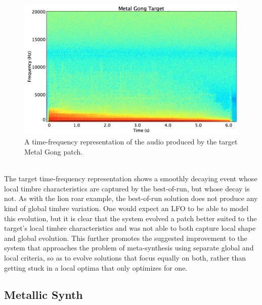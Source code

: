 \documentclass[12pt]{report} 	%
\numberwithin{figure}{chapter}
\numberwithin{table}{chapter}
\numberwithin{equation}{chapter}
\begin{document}
\begin{flushleft}
\begin{figure}[h!]
\begin{center}
\includegraphics[scale=0.35,width=\linewidth]{MetalGongTargetSTFT}
\caption[Target metal gong time-frequency representation]{A time-frequency representation of the audio produced by the target Metal Gong patch.}
\end{center}
\end{figure}
\\
The target time-frequency representation shows a smoothly decaying event whose local timbre characteristics are captured by the best-of-run, but whose decay is not. As with the lion roar example, the best-of-run solution does not produce any kind of global timbre variation. One would expect an LFO to be able to model this evolution, but it is clear that the system evolved a patch better suited to the target's local timbre characteristics and was not able to both capture local shape and global evolution. This further promotes the suggested improvement to the system that approaches the problem of meta-synthesis using separate global and local criteria, so as to evolve solutions that focus equally on both, rather than getting stuck in a local optima that only optimizes for one.

\subsection{Metallic Synth}


\end{flushleft}
\end{document}
